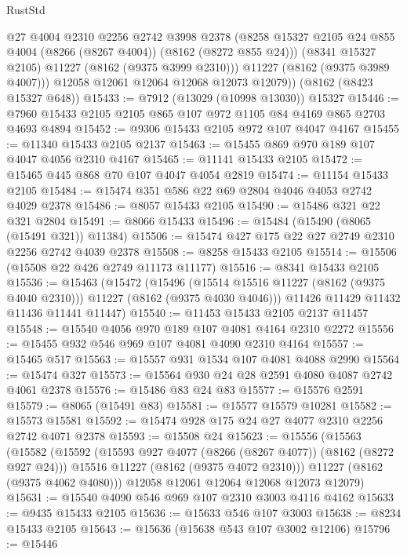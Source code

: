 \begin{lexlean}{RustStd}
\begin{coremodule}
            @27
            @4004
            @2310
            @2256
            @2742
            @3998
            @2378
            (@8258 @15327 @2105 @24 @855 @4004 (@8266 (@8267 @4004)) (@8162 (@8272 @855 @24)))
            (@8341 @15327 @2105)
            @11227
            (@8162 (@9375 @3999 @2310)))
          @11227
          (@8162 (@9375 @3989 @4007)))
        @12058
        @12061
        @12064
        @12068
        @12073
        @12079))
    (@8162 (@8423 @15327 @648))
@15433 := @7912 (@13029 (@10998 @13030)) @15327
@15446 := @7960 @15433 @2105 @2105 @865 @107 @972 @1105 @84 @4169 @865 @2703 @4693 @4894
@15452 := @9306 @15433 @2105 @972 @107 @4047 @4167
@15455 := @11340 @15433 @2105 @2137
@15463 := @15455 @869 @970 @189 @107 @4047 @4056 @2310 @4167
@15465 := @11141 @15433 @2105
@15472 := @15465 @445 @868 @70 @107 @4047 @4054 @2819
@15474 := @11154 @15433 @2105
@15484 := @15474 @351 @586 @22 @69 @2804 @4046 @4053 @2742 @4029 @2378
@15486 := @8057 @15433 @2105
@15490 := @15486 @321 @22 @321 @2804
@15491 := @8066 @15433
@15496 := @15484 (@15490 (@8065 (@15491 @321)) @11384)
@15506 := @15474 @427 @175 @22 @27 @2749 @2310 @2256 @2742 @4039 @2378
@15508 := @8258 @15433 @2105
@15514 := @15506 (@15508 @22 @426 @2749 @11173 @11177)
@15516 := @8341 @15433 @2105
@15536 := @15463
    (@15472
      (@15496 (@15514 @15516 @11227 (@8162 (@9375 @4040 @2310))) @11227 (@8162 (@9375 @4030 @4046)))
      @11426
      @11429
      @11432
      @11436
      @11441
      @11447)
@15540 := @11453 @15433 @2105 @2137 @11457
@15548 := @15540 @4056 @970 @189 @107 @4081 @4164 @2310 @2272
@15556 := @15455 @932 @546 @969 @107 @4081 @4090 @2310 @4164
@15557 := @15465 @517
@15563 := @15557 @931 @1534 @107 @4081 @4088 @2990
@15564 := @15474 @327
@15573 := @15564 @930 @24 @28 @2591 @4080 @4087 @2742 @4061 @2378
@15576 := @15486 @83 @24 @83
@15577 := @15576 @2591
@15579 := @8065 (@15491 @83)
@15581 := @15577 @15579 @10281
@15582 := @15573 @15581
@15592 := @15474 @928 @175 @24 @27 @4077 @2310 @2256 @2742 @4071 @2378
@15593 := @15508 @24
@15623 := @15556
    (@15563
      (@15582
        (@15592
          (@15593 @927 @4077 (@8266 (@8267 @4077)) (@8162 (@8272 @927 @24)))
          @15516
          @11227
          (@8162 (@9375 @4072 @2310)))
        @11227
        (@8162 (@9375 @4062 @4080)))
      @12058
      @12061
      @12064
      @12068
      @12073
      @12079)
@15631 := @15540 @4090 @546 @969 @107 @2310 @3003 @4116 @4162
@15633 := @9435 @15433 @2105
@15636 := @15633 @546 @107 @3003
@15638 := @8234 @15433 @2105
@15643 := @15636 (@15638 @543 @107 @3002 @12106)
@15796 := @15446

\end{coremodule}
\end{lexlean}
